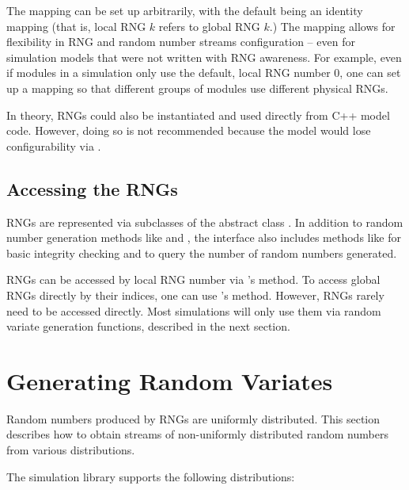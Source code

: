 The mapping can be set up arbitrarily, with the default being an identity
mapping (that is, local RNG $k$ refers to global RNG $k$.) The mapping
allows for flexibility in RNG and random number streams configuration
-- even for simulation models that were not written with RNG awareness.
For example, even if modules in a simulation only use the default, local
RNG number 0, one can set up a mapping so that different groups of modules
use different physical RNGs.

In theory, RNGs could also be instantiated and used directly from C++ model
code. However, doing so is not recommended because the model would lose
configurability via .

\subsection{Accessing the RNGs}
\label{sec:sim-lib:accessing-rngs}

RNGs are represented via subclasses of the abstract class .
In addition to random number generation methods like  and
, the  interface also includes methods like
 for basic integrity checking and 
to query the number of random numbers generated.

RNGs can be accessed by local RNG number via 's
 method. To access global RNGs directly by their
indices, one can use 's  method.
However, RNGs rarely need to be accessed directly. Most simulations will
only use them via random variate generation functions, described in the
next section.

\section{Generating Random Variates}
\label{sec:sim-lib:random-variate-generation}

Random numbers produced by RNGs are uniformly distributed. This section
describes how to obtain streams of non-uniformly distributed random numbers
from various distributions.

The simulation library supports the following distributions:

